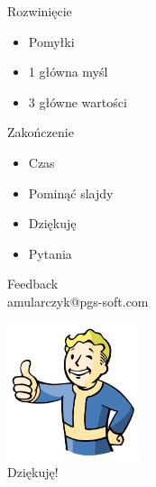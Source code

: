 \documentclass{beamer}
\begin{document}
\begin{frame}{}
	\begin{center}
		\Huge{Rozwinięcie}
	\end{center}
\end{frame}

\begin{frame}{}
	\begin{Large}
		\begin{itemize}[<+->]
			\item Pomyłki
			\item 1 główna myśl
			\item 3 główne wartości
		\end{itemize}
	\end{Large}
\end{frame}

\begin{frame}{}
	\begin{center}
		\Huge{Zakończenie}
	\end{center}
\end{frame}

\begin{frame}{}
	\begin{Large}
		\begin{itemize}[<+->]
			\item Czas
			\item Pominąć slajdy
			\item Dziękuję
			\item Pytania
		\end{itemize}
	\end{Large}
\end{frame}

\begin{frame}{}
	\begin{center}
		\Huge{Feedback}\\
		\setlength{\parskip}{1ex}
		\Large{amularczyk@pgs-soft.com}
	\end{center}
\end{frame}

\begin{frame}{}
	\begin{center}
  		\includegraphics[height=4cm]{ok.png} \\
		\Huge{Dziękuję!}
	\end{center}
\end{frame}
\end{document}
